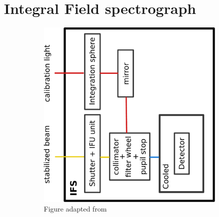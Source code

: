 \documentclass[twoside,single,12pt]{lion-msc}
\begin{document}
\section{Integral Field spectrograph}
\begin{figure}[hb]
\centering
\begin{subfigure}{.65\textwidth}
\centering 
\includegraphics[trim={12cm 5cm 12cm 7cm},clip,width = 1\linewidth]{overviewIFS}
\caption{Figure adapted from \cite{Observatory2007}} 
\end{subfigure}\hfill
\begin{subfigure}{.30\textwidth}
  \centering

\end{subfigure}
\end{figure}
\end{document}
